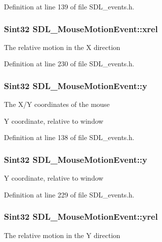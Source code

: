 Definition at line 139 of file S\+D\+L\+\_\+events.\+h.

\hypertarget{structSDL__MouseMotionEvent_a1c01d9aba2a20778fb45a15dca39ef58}{
\subsubsection[{xrel}]{\setlength{\rightskip}{0pt plus 5cm}Sint32 S\+D\+L\+\_\+\+Mouse\+Motion\+Event\+::xrel}}\label{structSDL__MouseMotionEvent_a1c01d9aba2a20778fb45a15dca39ef58}
The relative motion in the X direction 

Definition at line 230 of file S\+D\+L\+\_\+events.\+h.

\hypertarget{structSDL__MouseMotionEvent_a7e6a7b1f8713d1968dc913908e8ea448}{
\subsubsection[{y}]{\setlength{\rightskip}{0pt plus 5cm}Sint32 S\+D\+L\+\_\+\+Mouse\+Motion\+Event\+::y}}\label{structSDL__MouseMotionEvent_a7e6a7b1f8713d1968dc913908e8ea448}
The X/\+Y coordinates of the mouse

Y coordinate, relative to window 

Definition at line 138 of file S\+D\+L\+\_\+events.\+h.

\hypertarget{structSDL__MouseMotionEvent_a7e6a7b1f8713d1968dc913908e8ea448}{
\subsubsection[{y}]{\setlength{\rightskip}{0pt plus 5cm}Sint32 S\+D\+L\+\_\+\+Mouse\+Motion\+Event\+::y}}\label{structSDL__MouseMotionEvent_a7e6a7b1f8713d1968dc913908e8ea448}
Y coordinate, relative to window 

Definition at line 229 of file S\+D\+L\+\_\+events.\+h.

\hypertarget{structSDL__MouseMotionEvent_a7674c8b92d039ab948f671a180fa7b30}{
\subsubsection[{yrel}]{\setlength{\rightskip}{0pt plus 5cm}Sint32 S\+D\+L\+\_\+\+Mouse\+Motion\+Event\+::yrel}}\label{structSDL__MouseMotionEvent_a7674c8b92d039ab948f671a180fa7b30}
The relative motion in the Y direction 

